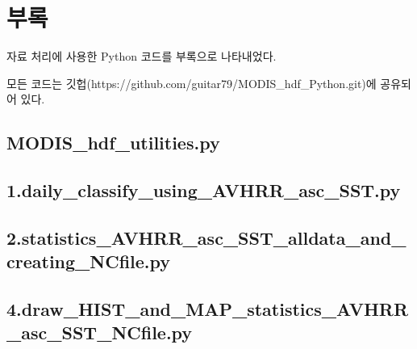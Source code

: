 
\section{부록}

자료 처리에 사용한 Python 코드를 부록으로 나타내었다. 

모든 코드는 깃헙(https://github.com/guitar79/MODIS\_hdf\_Python.git)에 공유되어 있다.

\subsection{MODIS\_hdf\_utilities.py}




\subsection{1.daily\_classify\_using\_AVHRR\_asc\_SST.py}


\subsection{2.statistics\_AVHRR\_asc\_SST\_alldata\_and\_creating\_NCfile.py}


\subsection{4.draw\_HIST\_and\_MAP\_statistics\_AVHRR\_asc\_SST\_NCfile.py}


